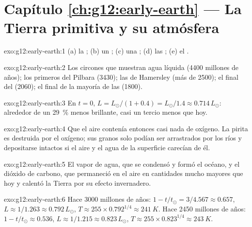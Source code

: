 \section*{Capítulo \ref{ch:g12:early-earth} --- La Tierra primitiva y su atmósfera}

\begin{solution}{exo:g12:early-earth:1}
(a) la ; (b) un ; (c) una ; (d) las ; (e) el .
\end{solution}

\begin{solution}{exo:g12:early-earth:2}
Los circones que muestran agua líquida (4400 millones de años); los primeros
 del Pilbara (3430); las  de
Hamersley (más de 2500); el final del  (2060); el
final de la mayoría de las  (1800).
\end{solution}

\begin{solution}{exo:g12:early-earth:3}
En $t = 0$, $L = L_\odot/(1 + 0.4) = L_\odot/1.4 \approx 0.714\,L_\odot$:
alrededor de un \qty{29}{\percent} menos brillante, casi un tercio menos que hoy.
\end{solution}

\begin{solution}{exo:g12:early-earth:4}
Que el aire contenía entonces casi nada de oxígeno. La pirita es destruida por
el oxígeno; sus granos solo podían ser arrastrados por los ríos y depositarse
intactos si el aire y el agua de la superficie carecían de él.
\end{solution}

\begin{solution}{exo:g12:early-earth:5}
El vapor de agua, que se condensó y formó el océano, y el dióxido de carbono,
que permaneció en el aire en cantidades mucho mayores que hoy y calentó la
Tierra por su efecto invernadero.
\end{solution}

\begin{solution}{exo:g12:early-earth:6}
Hace 3000 millones de años: $1 - t/t_\odot = 3/4.567 \approx 0.657$, $L \approx
1/1.263 \approx 0.792\,L_\odot$, $T \approx 255 \times 0.792^{1/4} \approx
\qty{241}{K}$. Hace 2450 millones de años: $1 - t/t_\odot \approx 0.536$, $L
\approx 1/1.215 \approx 0.823\,L_\odot$, $T \approx 255 \times 0.823^{1/4}
\approx \qty{243}{K}$.
\end{solution}

